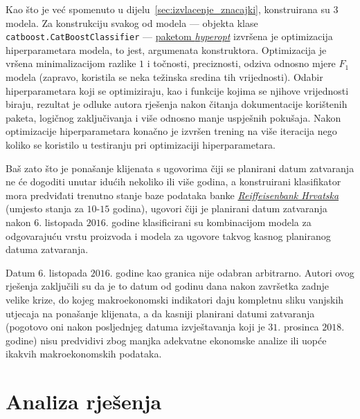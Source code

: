 \documentclass[paper = a4, fontsize = 11pt, DIV = 12, BCOR = 0pt, headings = standardclasses, numbers = endperiod]{scrartcl}
\begin{document}
	Kao što je već spomenuto u dijelu~\ref{sec:izvlacenje_znacajki}, konstruirana su $ 3 $ modela. Za konstrukciju svakog od modela --- objekta klase \lstinline[language = Python, style = lijepo]{catboost.CatBoostClassifier} --- \href{http://hyperopt.github.io/hyperopt/}{paketom \emph{hyperopt}} izvršena je optimizacija hiperparametara modela, to jest, argumenata konstruktora. Optimizacija je vršena minimalizacijom razlike $ 1 $ i točnosti, preciznosti, odziva odnosno mjere $ F_{1} $ modela (zapravo, koristila se neka težinska sredina tih vrijednosti). Odabir hiperparametara koji se optimiziraju, kao i funkcije kojima se njihove vrijednosti biraju, rezultat je odluke autora rješenja nakon čitanja dokumentacije korištenih paketa, logičnog zaključivanja i više odnosno manje uspješnih pokušaja. Nakon optimizacije hiperparametara konačno je izvršen trening na više iteracija nego koliko se koristilo u testiranju pri optimizaciji hiperparametara.

	\par

	Baš zato što je ponašanje klijenata s ugovorima čiji se planirani datum zatvaranja ne će dogoditi unutar idućih nekoliko ili više godina, a konstruirani klasifikator mora predviđati trenutno stanje baze podataka banke \href{http://rba.hr/}{\emph{Reiffeisenbank Hrvatska}} (umjesto stanja za $ 10 $-$ 15 $ godina), ugovori čiji je planirani datum zatvaranja nakon $ 6 $. listopada $ 2016 $. godine klasificirani su kombinacijom modela za odgovarajuću vrstu proizvoda i modela za ugovore takvog kasnog planiranog datuma zatvaranja.

	\par

	Datum $ 6 $. listopada $ 2016 $. godine kao granica nije odabran arbitrarno. Autori ovog rješenja zaključili su da je to datum od godinu dana nakon završetka zadnje velike krize, do kojeg makroekonomski indikatori daju kompletnu sliku vanjskih utjecaja na ponašanje klijenata, a da kasniji planirani datumi zatvaranja (pogotovo oni nakon posljednjeg datuma izvještavanja koji je $ 31 $. prosinca $ 2018 $. godine) nisu predvidivi zbog manjka adekvatne ekonomske analize ili uopće ikakvih makroekonomskih podataka.

	\par

	\section{Analiza rješenja}
	\label{sec:analiza_rjesenja}
\end{document}
